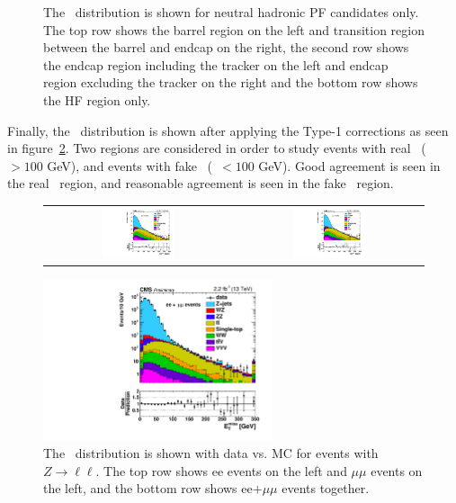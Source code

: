 \begin{figure}[!htb]
\begin{center}
    \caption{
      \label{fig:nupfcands}
      The \MET\ distribution is shown for neutral hadronic PF candidates only.
      The top row shows the barrel region on the left and transition region between the barrel and endcap on the right,
      the second row shows the endcap region including the tracker on the left and endcap region excluding the tracker on the right
      and the bottom row shows the HF region only.
    }
  \end{center}
\end{figure}

\clearpage

Finally, the \MET\ distribution is shown after applying the Type-1 corrections as seen in figure~\ref{fig:T1MET_datavsmc}.
Two regions are considered in order to study events with real \MET\ (\MET\ $> 100$ GeV),
and events with fake \MET\ (\MET\ $< 100$ GeV). 
Good agreement is seen in the real \MET\ region,
and reasonable agreement is seen in the fake \MET\ region.

\begin{figure}[!ht]
\begin{center}
\begin{tabular}{cc}
\includegraphics[width=0.4\textwidth]{MET/figs/h_met_T1CHS_pt_ee_inclusive_passtrig.pdf} &
\includegraphics[width=0.4\textwidth]{MET/figs/h_met_T1CHS_pt_mm_inclusive_passtrig.pdf} \\
\end{tabular}
\includegraphics[width=0.6\textwidth]{MET/figs/h_met_T1CHS_pt_ll_inclusive_passtrig.pdf}
\caption{The \MET\ distribution is shown with data vs. MC for events with $Z\rightarrow\ell\ell$.
The top row shows ee events on the left and $\mu\mu$ events on the left,
and the bottom row shows ee$+\mu\mu$ events together.
\label{fig:T1MET_datavsmc}
}
\end{center}
\end{figure}

